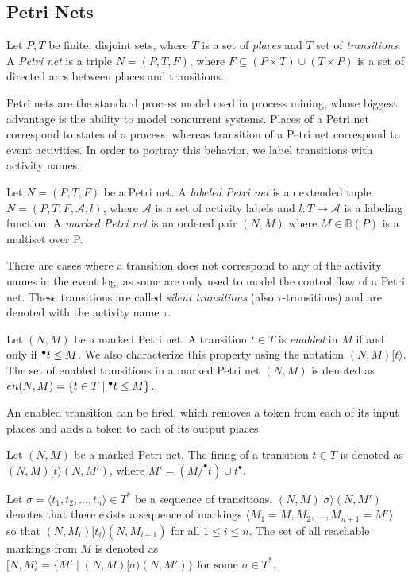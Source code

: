 \subsection{Petri Nets}

\begin{definition}
\label{def:petrinet}
    Let $P, T$ be finite, disjoint sets, where $T$ is a set of \emph{places} and $T$ set of \emph{transitions}. A \emph{Petri net} is a triple $N = (P, T, F)$, where $F \subseteq (P \times T) \cup (T \times P)$ is a set of directed arcs between places and transitions.
\end{definition}

Petri nets are the standard process model used in process mining, whose biggest advantage is the ability to model concurrent systems. Places of a Petri net correspond to states of a process, whereas transition of a Petri net correspond to event activities. In order to portray this behavior, we label transitions with activity names.

\begin{definition}
    Let $N = (P, T, F)$ be a Petri net. A \emph{labeled Petri net} is an extended tuple $N = (P, T, F, \mathcal{A}, l)$, where $\mathcal{A}$ is a set of activity labels and $l: T \rightarrow \mathcal{A}$ is a labeling function. A \emph{marked Petri net} is an ordered pair $(N, M)$ where $M \in \mathbb{B}(P)$ is a multiset over P.
\end{definition}

There are cases where a transition does not correspond to any of the activity names in the event log, as some are only used to model the control flow of a Petri net. These transitions are called \emph{silent transitions} (also $\tau$-transitions) and are denoted with the activity name $\tau$.

\begin{definition}
    Let $(N, M)$ be a marked Petri net. A transition $t \in T$ is \emph{enabled} in $M$ if and only if ${^{\bullet}t} \leq M$. We also characterize this property using the notation $(N, M)[t\rangle$. The set of enabled transitions in a marked Petri net $(N, M)$ is denoted as $en(N, M) = \{ t \in T \mid {^{\bullet}t} \leq M \}$.
\end{definition}

An enabled transition can be fired, which removes a token from each of its input places and adds a token to each of its output places.

\begin{definition}
    Let $(N, M)$ be a marked Petri net. The firing of a transition $t \in T$ is denoted as $(N, M) [t\rangle (N, M')$, where $M' = (M / ^{\bullet}t) \cup t^{\bullet}$.

    Let $\sigma = \langle t_1, t_2, \dots, t_n \rangle \in T^*$ be a sequence of transitions. $(N, M)[\sigma \rangle (N, M')$ denotes that there exists a sequence of markings $\langle M_1 = M, M_2, \dots, M_{n+1} = M' \rangle$ so that $(N, M_i)[t_i \rangle (N, M_{i+1})$ for all $1 \leq i \leq n$. The set of all reachable markings from $M$ is denoted as $[N, M\rangle = \{ M' \mid (N, M) [\sigma\rangle (N, M') \} \text{ for some } \sigma \in T^*$.
\end{definition}

